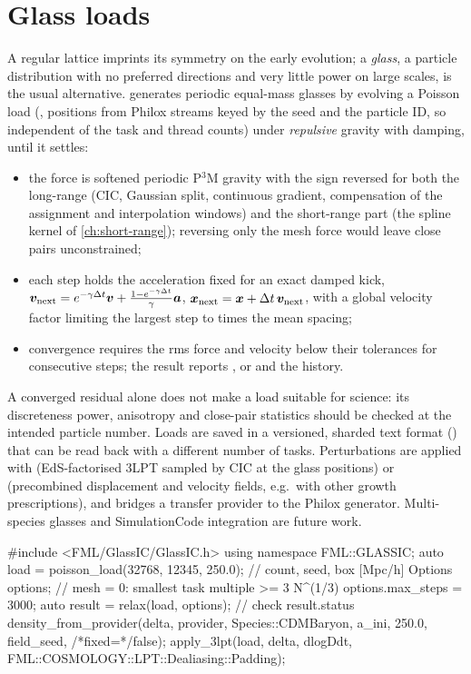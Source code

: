 \section{Glass loads}\label{sec:lpt-glass}

A regular lattice imprints its symmetry on the early evolution; a \emph{glass}, a particle distribution with no
preferred directions and very little power on large scales, is the usual alternative. 
generates periodic equal-mass glasses by evolving a Poisson load (, positions from Philox streams
keyed by the seed and the particle ID, so independent of the task and thread counts) under \emph{repulsive} gravity
with damping, until it settles:
\begin{itemize}
\item the force is softened periodic P$^3$M gravity with the sign reversed for both the long-range (CIC, Gaussian
      split, continuous gradient, compensation of the assignment and interpolation windows) and the short-range part
      (the spline kernel of \cref{ch:short-range}); reversing only the mesh force would leave close pairs unconstrained;
\item each step holds the acceleration fixed for an exact damped kick,
      $\bm v_{\rm next}=e^{-\gamma\Delta t}\bm v+\frac{1-e^{-\gamma\Delta t}}{\gamma}\bm a$, $\bm{x}_{\rm next}=\bm{x}+\Delta t\,\bm v_{\rm next}$,
      with a global velocity factor limiting the largest step to  times the mean spacing;
\item convergence requires the rms force and velocity below their tolerances for  consecutive steps;
      the result reports ,  or  and the history.
\end{itemize}
A converged residual alone does not make a load suitable for science: its discreteness power, anisotropy and
close-pair statistics should be checked at the intended particle number. Loads are saved in a versioned, sharded
text format () that can be read back with a different number of tasks. Perturbations are applied with
 (EdS-factorised 3LPT sampled by CIC at the glass
positions) or  (precombined displacement and velocity fields, e.g.\ with other growth
prescriptions), and  bridges a transfer provider to the Philox generator. Multi-species
glasses and SimulationCode integration are future work.

\begin{cppcode}
#include <FML/GlassIC/GlassIC.h>
using namespace FML::GLASSIC;
auto load = poisson_load(32768, 12345, 250.0);   // count, seed, box [Mpc/h]
Options options;                                  // mesh = 0: smallest task multiple >= 3 N^(1/3)
options.max_steps = 3000;
auto result = relax(load, options);              // check result.status
density_from_provider(delta, provider, Species::CDMBaryon, a_ini, 250.0, field_seed, /*fixed=*/false);
apply_3lpt(load, delta, dlogDdt, FML::COSMOLOGY::LPT::Dealiasing::Padding);
\end{cppcode}
